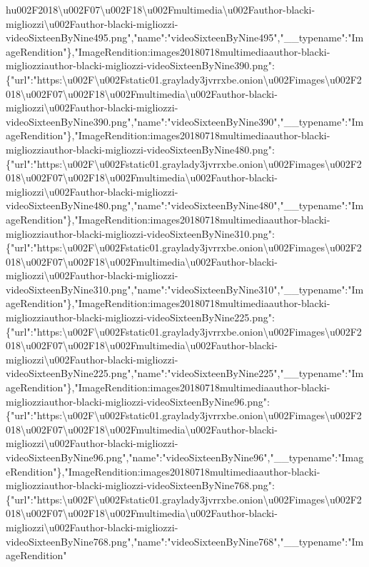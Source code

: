 h{}u002F2018\textbackslash{}u002F07\textbackslash{}u002F18\textbackslash{}u002Fmultimedia\textbackslash{}u002Fauthor-blacki-migliozzi\textbackslash{}u002Fauthor-blacki-migliozzi-videoSixteenByNine495.png","name":"videoSixteenByNine495","\_\_typename":"ImageRendition"\},"ImageRendition:images20180718multimediaauthor-blacki-migliozziauthor-blacki-migliozzi-videoSixteenByNine390.png":\{"url":"https:\textbackslash{}u002F\textbackslash{}u002Fstatic01.graylady3jvrrxbe.onion\textbackslash{}u002Fimages\textbackslash{}u002F2018\textbackslash{}u002F07\textbackslash{}u002F18\textbackslash{}u002Fmultimedia\textbackslash{}u002Fauthor-blacki-migliozzi\textbackslash{}u002Fauthor-blacki-migliozzi-videoSixteenByNine390.png","name":"videoSixteenByNine390","\_\_typename":"ImageRendition"\},"ImageRendition:images20180718multimediaauthor-blacki-migliozziauthor-blacki-migliozzi-videoSixteenByNine480.png":\{"url":"https:\textbackslash{}u002F\textbackslash{}u002Fstatic01.graylady3jvrrxbe.onion\textbackslash{}u002Fimages\textbackslash{}u002F2018\textbackslash{}u002F07\textbackslash{}u002F18\textbackslash{}u002Fmultimedia\textbackslash{}u002Fauthor-blacki-migliozzi\textbackslash{}u002Fauthor-blacki-migliozzi-videoSixteenByNine480.png","name":"videoSixteenByNine480","\_\_typename":"ImageRendition"\},"ImageRendition:images20180718multimediaauthor-blacki-migliozziauthor-blacki-migliozzi-videoSixteenByNine310.png":\{"url":"https:\textbackslash{}u002F\textbackslash{}u002Fstatic01.graylady3jvrrxbe.onion\textbackslash{}u002Fimages\textbackslash{}u002F2018\textbackslash{}u002F07\textbackslash{}u002F18\textbackslash{}u002Fmultimedia\textbackslash{}u002Fauthor-blacki-migliozzi\textbackslash{}u002Fauthor-blacki-migliozzi-videoSixteenByNine310.png","name":"videoSixteenByNine310","\_\_typename":"ImageRendition"\},"ImageRendition:images20180718multimediaauthor-blacki-migliozziauthor-blacki-migliozzi-videoSixteenByNine225.png":\{"url":"https:\textbackslash{}u002F\textbackslash{}u002Fstatic01.graylady3jvrrxbe.onion\textbackslash{}u002Fimages\textbackslash{}u002F2018\textbackslash{}u002F07\textbackslash{}u002F18\textbackslash{}u002Fmultimedia\textbackslash{}u002Fauthor-blacki-migliozzi\textbackslash{}u002Fauthor-blacki-migliozzi-videoSixteenByNine225.png","name":"videoSixteenByNine225","\_\_typename":"ImageRendition"\},"ImageRendition:images20180718multimediaauthor-blacki-migliozziauthor-blacki-migliozzi-videoSixteenByNine96.png":\{"url":"https:\textbackslash{}u002F\textbackslash{}u002Fstatic01.graylady3jvrrxbe.onion\textbackslash{}u002Fimages\textbackslash{}u002F2018\textbackslash{}u002F07\textbackslash{}u002F18\textbackslash{}u002Fmultimedia\textbackslash{}u002Fauthor-blacki-migliozzi\textbackslash{}u002Fauthor-blacki-migliozzi-videoSixteenByNine96.png","name":"videoSixteenByNine96","\_\_typename":"ImageRendition"\},"ImageRendition:images20180718multimediaauthor-blacki-migliozziauthor-blacki-migliozzi-videoSixteenByNine768.png":\{"url":"https:\textbackslash{}u002F\textbackslash{}u002Fstatic01.graylady3jvrrxbe.onion\textbackslash{}u002Fimages\textbackslash{}u002F2018\textbackslash{}u002F07\textbackslash{}u002F18\textbackslash{}u002Fmultimedia\textbackslash{}u002Fauthor-blacki-migliozzi\textbackslash{}u002Fauthor-blacki-migliozzi-videoSixteenByNine768.png","name":"videoSixteenByNine768","\_\_typename":"ImageRendition"